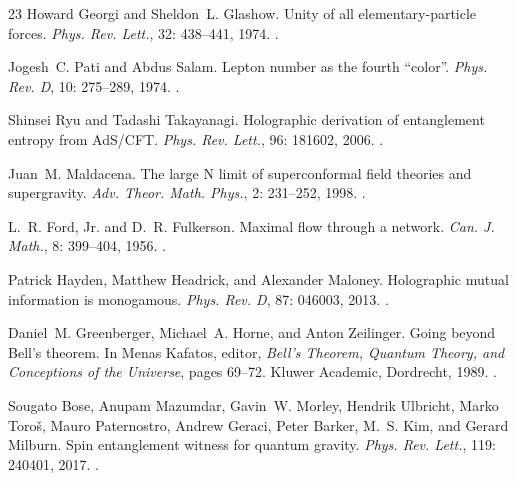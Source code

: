 \documentclass[11pt]{article}
\theoremstyle{definition}
\begin{document}
\begin{thebibliography}{23}
Howard Georgi and Sheldon~L. Glashow.
\newblock Unity of all elementary-particle forces.
\newblock \emph{Phys. Rev. Lett.}, 32: 438--441, 1974.
\newblock {}.

Jogesh~C. Pati and Abdus Salam.
\newblock Lepton number as the fourth ``color''.
\newblock \emph{Phys. Rev. D}, 10: 275--289, 1974.
\newblock {}.

Shinsei Ryu and Tadashi Takayanagi.
\newblock Holographic derivation of entanglement entropy from {AdS/CFT}.
\newblock \emph{Phys. Rev. Lett.}, 96: 181602, 2006.
\newblock {}.

Juan~M. Maldacena.
\newblock The large {N} limit of superconformal field theories and supergravity.
\newblock \emph{Adv. Theor. Math. Phys.}, 2: 231--252, 1998.
\newblock {}.

L.~R. Ford, Jr. and D.~R. Fulkerson.
\newblock Maximal flow through a network.
\newblock \emph{Can. J. Math.}, 8: 399--404, 1956.
\newblock {}.

Patrick Hayden, Matthew Headrick, and Alexander Maloney.
\newblock Holographic mutual information is monogamous.
\newblock \emph{Phys. Rev. D}, 87: 046003, 2013.
\newblock {}.

Daniel~M. Greenberger, Michael~A. Horne, and Anton Zeilinger.
\newblock Going beyond {Bell}'s theorem.
\newblock In Menas Kafatos, editor, \emph{Bell's Theorem, Quantum Theory, and Conceptions of the Universe}, pages 69--72. Kluwer Academic, Dordrecht, 1989.
\newblock {}.

Sougato Bose, Anupam Mazumdar, Gavin~W. Morley, Hendrik Ulbricht, Marko Toro\v{s}, Mauro Paternostro, Andrew Geraci, Peter Barker, M.~S. Kim, and Gerard Milburn.
\newblock Spin entanglement witness for quantum gravity.
\newblock \emph{Phys. Rev. Lett.}, 119: 240401, 2017.
\newblock {}.


\end{thebibliography}
\end{document}
